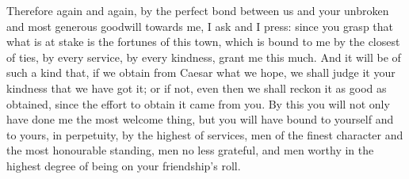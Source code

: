  Therefore again and again, by the perfect bond between us and your unbroken and most generous goodwill towards me, I ask and I press: since you grasp that what is at stake is the fortunes of this town, which is bound to me by the closest of ties, by every service, by every kindness, grant me this much. And it will be of such a kind that, if we obtain from Caesar what we hope, we shall judge it your kindness that we have got it; or if not, even then we shall reckon it as good as obtained, since the effort to obtain it came from you. By this you will not only have done me the most welcome thing, but you will have bound to yourself and to yours, in perpetuity, by the highest of services, men of the finest character and the most honourable standing, men no less grateful, and men worthy in the highest degree of being on your friendship's roll.

